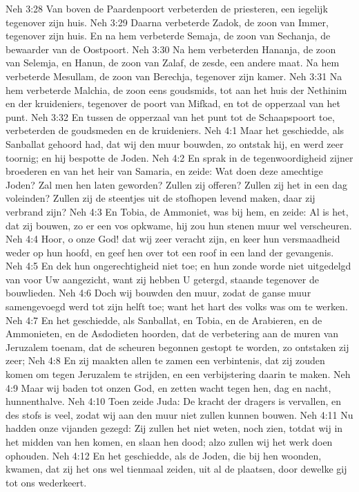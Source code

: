 Neh 3:28  Van boven de Paardenpoort verbeterden de priesteren, een iegelijk tegenover zijn huis.
Neh 3:29  Daarna verbeterde Zadok, de zoon van Immer, tegenover zijn huis. En na hem verbeterde Semaja, de zoon van Sechanja, de bewaarder van de Oostpoort.
Neh 3:30  Na hem verbeterden Hananja, de zoon van Selemja, en Hanun, de zoon van Zalaf, de zesde, een andere maat. Na hem verbeterde Mesullam, de zoon van Berechja, tegenover zijn kamer.
Neh 3:31  Na hem verbeterde Malchia, de zoon eens goudsmids, tot aan het huis der Nethinim en der kruideniers, tegenover de poort van Mifkad, en tot de opperzaal van het punt.
Neh 3:32  En tussen de opperzaal van het punt tot de Schaapspoort toe, verbeterden de goudsmeden en de kruideniers.
Neh 4:1  Maar het geschiedde, als Sanballat gehoord had, dat wij den muur bouwden, zo ontstak hij, en werd zeer toornig; en hij bespotte de Joden.
Neh 4:2  En sprak in de tegenwoordigheid zijner broederen en van het heir van Samaria, en zeide: Wat doen deze amechtige Joden? Zal men hen laten geworden? Zullen zij offeren? Zullen zij het in een dag voleinden? Zullen zij de steentjes uit de stofhopen levend maken, daar zij verbrand zijn?
Neh 4:3  En Tobia, de Ammoniet, was bij hem, en zeide: Al is het, dat zij bouwen, zo er een vos opkwame, hij zou hun stenen muur wel verscheuren.
Neh 4:4  Hoor, o onze God! dat wij zeer veracht zijn, en keer hun versmaadheid weder op hun hoofd, en geef hen over tot een roof in een land der gevangenis.
Neh 4:5  En dek hun ongerechtigheid niet toe; en hun zonde worde niet uitgedelgd van voor Uw aangezicht, want zij hebben U getergd, staande tegenover de bouwlieden.
Neh 4:6  Doch wij bouwden den muur, zodat de ganse muur samengevoegd werd tot zijn helft toe; want het hart des volks was om te werken.
Neh 4:7  En het geschiedde, als Sanballat, en Tobia, en de Arabieren, en de Ammonieten, en de Asdodieten hoorden, dat de verbetering aan de muren van Jeruzalem toenam, dat de scheuren begonnen gestopt te worden, zo ontstaken zij zeer;
Neh 4:8  En zij maakten allen te zamen een verbintenis, dat zij zouden komen om tegen Jeruzalem te strijden, en een verbijstering daarin te maken.
Neh 4:9  Maar wij baden tot onzen God, en zetten wacht tegen hen, dag en nacht, hunnenthalve.
Neh 4:10  Toen zeide Juda: De kracht der dragers is vervallen, en des stofs is veel, zodat wij aan den muur niet zullen kunnen bouwen.
Neh 4:11  Nu hadden onze vijanden gezegd: Zij zullen het niet weten, noch zien, totdat wij in het midden van hen komen, en slaan hen dood; alzo zullen wij het werk doen ophouden.
Neh 4:12  En het geschiedde, als de Joden, die bij hen woonden, kwamen, dat zij het ons wel tienmaal zeiden, uit al de plaatsen, door dewelke gij tot ons wederkeert.
